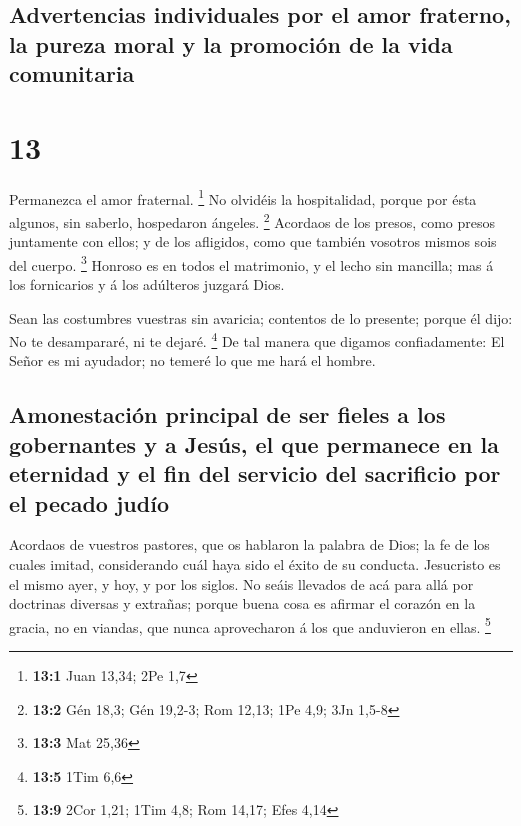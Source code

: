 \hypertarget{advertencias-individuales-por-el-amor-fraterno-la-pureza-moral-y-la-promociuxf3n-de-la-vida-comunitaria}{%
\subsection{Advertencias individuales por el amor fraterno, la pureza
moral y la promoción de la vida
comunitaria}\label{advertencias-individuales-por-el-amor-fraterno-la-pureza-moral-y-la-promociuxf3n-de-la-vida-comunitaria}}

\hypertarget{section-12}{%
\section{13}\label{section-12}}

 Permanezca el amor fraternal. \footnote{\textbf{13:1} Juan
  13,34; 2Pe 1,7}  No olvidéis la hospitalidad, porque por
ésta algunos, sin saberlo, hospedaron ángeles. \footnote{\textbf{13:2}
  Gén 18,3; Gén 19,2-3; Rom 12,13; 1Pe 4,9; 3Jn 1,5-8} 
Acordaos de los presos, como presos juntamente con ellos; y de los
afligidos, como que también vosotros mismos sois del cuerpo. \footnote{\textbf{13:3}
  Mat 25,36}  Honroso es en todos el matrimonio, y el lecho
sin mancilla; mas á los fornicarios y á los adúlteros juzgará Dios.

 Sean las costumbres vuestras sin avaricia; contentos de lo
presente; porque él dijo: No te desampararé, ni te dejaré. \footnote{\textbf{13:5}
  1Tim 6,6}  De tal manera que digamos confiadamente: El
Señor es mi ayudador; no temeré lo que me hará el hombre.

\hypertarget{amonestaciuxf3n-principal-de-ser-fieles-a-los-gobernantes-y-a-jesuxfas-el-que-permanece-en-la-eternidad-y-el-fin-del-servicio-del-sacrificio-por-el-pecado-juduxedo}{%
\subsection{Amonestación principal de ser fieles a los gobernantes y a
Jesús, el que permanece en la eternidad y el fin del servicio del
sacrificio por el pecado
judío}\label{amonestaciuxf3n-principal-de-ser-fieles-a-los-gobernantes-y-a-jesuxfas-el-que-permanece-en-la-eternidad-y-el-fin-del-servicio-del-sacrificio-por-el-pecado-juduxedo}}

 Acordaos de vuestros pastores, que os hablaron la palabra
de Dios; la fe de los cuales imitad, considerando cuál haya sido el
éxito de su conducta.  Jesucristo es el mismo ayer, y hoy, y
por los siglos.  No seáis llevados de acá para allá por
doctrinas diversas y extrañas; porque buena cosa es afirmar el corazón
en la gracia, no en viandas, que nunca aprovecharon á los que anduvieron
en ellas. \footnote{\textbf{13:9} 2Cor 1,21; 1Tim 4,8; Rom 14,17; Efes
  4,14}

